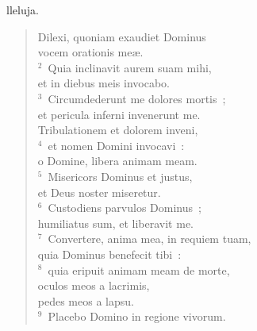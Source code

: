 \bchapter
{}lleluja. \begin{flushleft}\begin{verse}\vspace{6pt}Dilexi, quoniam exaudiet Dominus\\ vocem orationis me\ae .\\
${}^{2}$~Quia inclinavit aurem suam mihi,\\ et in diebus meis invocabo.\\
${}^{3}$~Circumdederunt me dolores mortis~;\\ et pericula inferni invenerunt me.\\ Tribulationem et dolorem inveni,\\
${}^{4}$~et nomen Domini invocavi~:\\ o Domine, libera animam meam.\\
${}^{5}$~Misericors Dominus et justus,\\ et Deus noster miseretur.\\
${}^{6}$~Custodiens parvulos Dominus~;\\ humiliatus sum, et liberavit me.\\
${}^{7}$~Convertere, anima mea, in requiem tuam,\\ quia Dominus benefecit tibi~:\\
${}^{8}$~quia eripuit animam meam de morte,\\ oculos meos a lacrimis,\\ pedes meos a lapsu.\\
${}^{9}$~Placebo Domino in regione vivorum.\end{verse}\end{flushleft}



